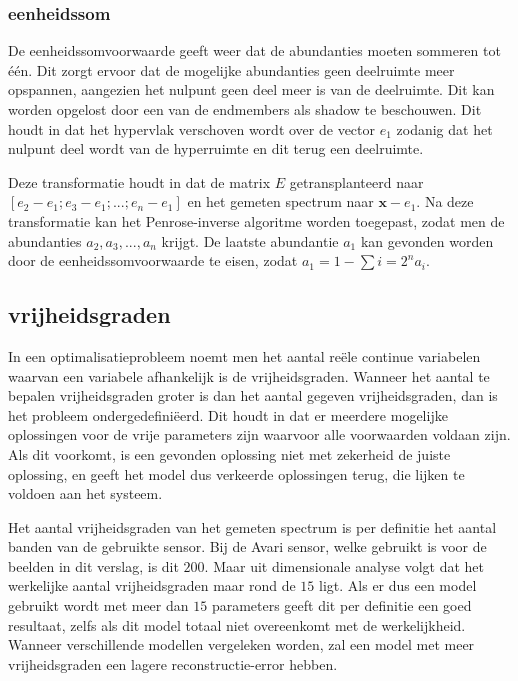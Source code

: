 \documentclass[12pt]{report}
\begin{document}
\subsubsection{eenheidssom}

De eenheidssomvoorwaarde geeft weer dat de abundanties moeten sommeren tot \'e\'en. Dit zorgt ervoor dat de mogelijke abundanties geen deelruimte meer opspannen, aangezien het nulpunt geen deel meer is van de deelruimte. Dit kan worden opgelost door een van de endmembers als shadow te beschouwen. Dit houdt in dat het hypervlak verschoven wordt over de vector $e_1$ zodanig dat het nulpunt deel wordt van de hyperruimte en dit terug een deelruimte.

Deze transformatie houdt in dat de matrix $E$ getransplanteerd naar $[e_2-e_1;e_3-e_1;...;e_n-e_1]$ en het gemeten spectrum naar $\bm{x} - e_1$. Na deze transformatie kan het Penrose-inverse algoritme worden toegepast, zodat men de abundanties $a_2,a_3,...,a_n$ krijgt. De laatste abundantie $a_1$ kan gevonden worden door de eenheidssomvoorwaarde te eisen, zodat $a_1 = 1 - \sum{i=2}^{n} a_i$.

\subsection{vrijheidsgraden} \label{sec:vrij}

In een optimalisatieprobleem noemt men het aantal re\"ele continue variabelen waarvan een variabele afhankelijk is de vrijheidsgraden. Wanneer het aantal te bepalen vrijheidsgraden groter is dan het aantal gegeven vrijheidsgraden, dan is het probleem ondergedefini\"eerd. Dit houdt in dat er meerdere mogelijke oplossingen voor de vrije parameters zijn waarvoor alle voorwaarden voldaan zijn. Als dit voorkomt, is een gevonden oplossing niet met zekerheid de juiste oplossing, en geeft het model dus verkeerde oplossingen terug, die lijken te voldoen aan het systeem.

Het aantal vrijheidsgraden van het gemeten spectrum is per definitie het aantal banden van de gebruikte sensor. Bij de Avari sensor, welke gebruikt is voor de beelden in dit verslag, is dit $200$. Maar uit dimensionale analyse volgt dat het werkelijke aantal vrijheidsgraden maar rond de $15$ ligt. Als er dus een model gebruikt wordt met meer dan $15$ parameters geeft dit per definitie een goed resultaat, zelfs als dit model totaal niet overeenkomt met de werkelijkheid. Wanneer verschillende modellen vergeleken worden, zal een model met meer vrijheidsgraden een lagere reconstructie-error hebben. 
 
\end{document}
